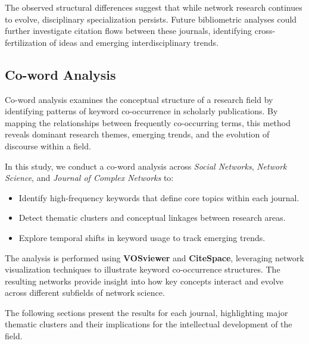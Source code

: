 \documentclass[twocolumn]{article}
\begin{document}
		The observed structural differences suggest that while network research continues to evolve, disciplinary specialization persists. Future bibliometric analyses could further investigate citation flows between these journals, identifying cross-fertilization of ideas and emerging interdisciplinary trends.
		
		\subsection{Co-word Analysis}
		
		Co-word analysis examines the conceptual structure of a research field by identifying patterns of keyword co-occurrence in scholarly publications. By mapping the relationships between frequently co-occurring terms, this method reveals dominant research themes, emerging trends, and the evolution of discourse within a field.
		
		In this study, we conduct a co-word analysis across \textit{Social Networks}, \textit{Network Science}, and \textit{Journal of Complex Networks} to:
		
		\begin{itemize}
			\item Identify high-frequency keywords that define core topics within each journal.
			\item Detect thematic clusters and conceptual linkages between research areas.
			\item Explore temporal shifts in keyword usage to track emerging trends.
		\end{itemize}
		
		The analysis is performed using \textbf{VOSviewer} and \textbf{CiteSpace}, leveraging network visualization techniques to illustrate keyword co-occurrence structures. The resulting networks provide insight into how key concepts interact and evolve across different subfields of network science.
		
		The following sections present the results for each journal, highlighting major thematic clusters and their implications for the intellectual development of the field.
		
\end{document}
